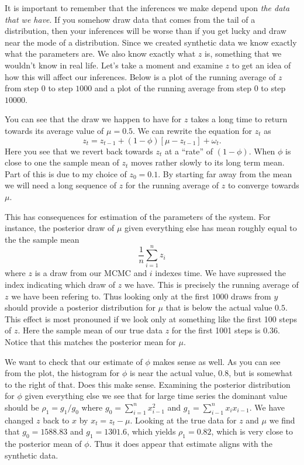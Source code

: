 \documentclass{article}
\begin{document}
It is important to remember that the inferences we make depend upon \emph{the data that we have}.  If you somehow draw data that comes from the tail of a distribution, then your inferences will be worse than if you get lucky and draw near the mode of a distribution.  Since we created synthetic data we know exactly what the parameters are.  We also know exactly what $z$ is, something that we wouldn't know in real life.  Let's take a moment and examine $z$ to get an idea of how this will affect our inferences.  Below is a plot of the running average of $z$ from step $0$ to step $1000$ and a plot of the running average from step $0$ to step $10000$.

\begin{figure}[!h]
\begin{center}
\end{center}
\end{figure}

You can see that the draw we happen to have for $z$ takes a long time to return towards its average value of $\mu = 0.5$.  We can rewrite the equation for $z_t$ as
\[
z_{t} = z_{t-1} + (1 - \phi) [\mu - z_{t-1}] + \omega_t.
\]
Here you see that we revert back towards $z_t$ at a ``rate'' of $(1-\phi)$.  When $\phi$ is close to one the sample mean of $z_t$ moves rather slowly to its long term mean.  Part of this is due to my choice of $z_0 = 0.1$.  By starting far away from the mean we will need a long sequence of $z$ for the running average of $z$ to converge towards $\mu$.

This has consequences for estimation of the parameters of the system.  For instance, the posterior draw of $\mu$ given everything else has mean roughly equal to the the sample mean
\[
\frac{1}{n} \sum_{i=1}^n z_i
\]
where $z$ is a draw from our MCMC and $i$ indexes time.  We have supressed the index indicating which draw of $z$ we have.  This is precisely the running average of $z$ we have been refering to.  Thus looking only at the first $1000$ draws from $y$ should provide a posterior distribution for $\mu$ that is below the actual value $0.5$.  This effect is most pronouned if we look only at something like the first 100 steps of $z$.  Here the sample mean of our true data $z$ for the first 1001 steps is $0.36$.  Notice that this matches the posterior mean for $\mu$.

We want to check that our estimate of $\phi$ makes sense as well.  As you can see from the plot, the histogram for $\phi$ is near the actual value, $0.8$, but is somewhat to the right of that.  Does this make sense.  Examining the posterior distribution for $\phi$ given everything else we see that for large time series the dominant value should be $\rho_1 = g_1/g_0$ where $g_0 = \sum_{i=1}^n x_{i-1}^2$ and $g_1 = \sum_{i-1}^n x_i x_{i-1}$.  We have changed $z$ back to $x$ by $x_t = z_t - \mu$.  Looking at the true data for $z$ and $\mu$ we find that $g_0 = 1588.83$ and $g_1 = 1301.6$, which yields $\rho_1 = 0.82$, which is very close to the posterior mean of $\phi$.  Thus it does appear that estimate aligns with the synthetic data.
\end{document}
